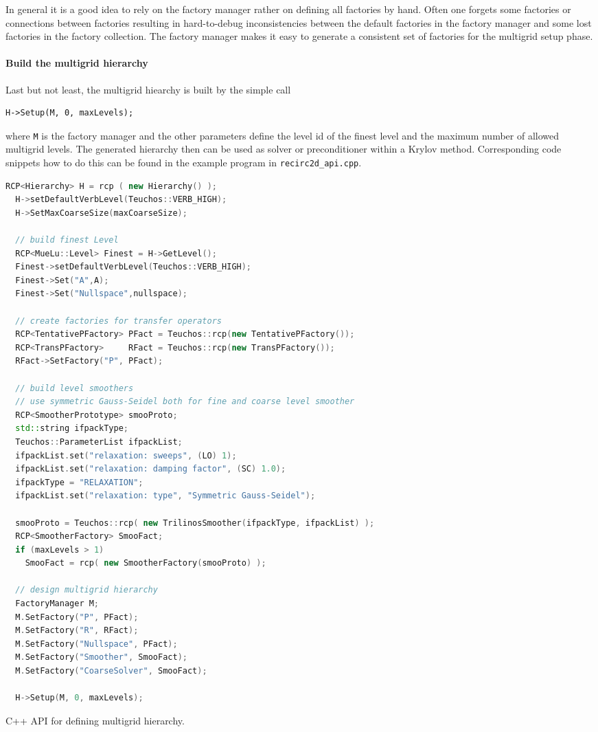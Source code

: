 \documentclass[12pt,a4paper]{article}
\begin{document}
In general it is a good idea to rely on the factory manager rather on defining all factories by hand. Often one forgets some factories or connections between factories resulting in hard-to-debug inconsistencies between the default factories in the factory manager and some lost factories in the factory collection. The factory manager makes it easy to generate a consistent set of factories for the multigrid setup phase.

\paragraph{Build the multigrid hierarchy}
Last but not least, the multigrid hiearchy is built by the simple call
\begin{verbatim}
H->Setup(M, 0, maxLevels);
\end{verbatim}
where \verb|M| is the factory manager and the other parameters define the level id of the finest level and the maximum number of allowed multigrid levels.
The generated hierarchy then can be used as solver or preconditioner within a Krylov method. Corresponding code snippets how to do this can be found in the example program in \verb|recirc2d_api.cpp|.

\begin{Listing}
\begin{center}
\begin{lstlisting}[language=c++]
  RCP<Hierarchy> H = rcp ( new Hierarchy() );
  H->setDefaultVerbLevel(Teuchos::VERB_HIGH);
  H->SetMaxCoarseSize(maxCoarseSize);

  // build finest Level
  RCP<MueLu::Level> Finest = H->GetLevel();
  Finest->setDefaultVerbLevel(Teuchos::VERB_HIGH);
  Finest->Set("A",A);
  Finest->Set("Nullspace",nullspace);

  // create factories for transfer operators
  RCP<TentativePFactory> PFact = Teuchos::rcp(new TentativePFactory());
  RCP<TransPFactory>     RFact = Teuchos::rcp(new TransPFactory());
  RFact->SetFactory("P", PFact);

  // build level smoothers
  // use symmetric Gauss-Seidel both for fine and coarse level smoother
  RCP<SmootherPrototype> smooProto;
  std::string ifpackType;
  Teuchos::ParameterList ifpackList;
  ifpackList.set("relaxation: sweeps", (LO) 1);
  ifpackList.set("relaxation: damping factor", (SC) 1.0);
  ifpackType = "RELAXATION";
  ifpackList.set("relaxation: type", "Symmetric Gauss-Seidel");

  smooProto = Teuchos::rcp( new TrilinosSmoother(ifpackType, ifpackList) );
  RCP<SmootherFactory> SmooFact;
  if (maxLevels > 1)
    SmooFact = rcp( new SmootherFactory(smooProto) );

  // design multigrid hierarchy
  FactoryManager M;
  M.SetFactory("P", PFact);
  M.SetFactory("R", RFact);
  M.SetFactory("Nullspace", PFact);
  M.SetFactory("Smoother", SmooFact);
  M.SetFactory("CoarseSolver", SmooFact);

  H->Setup(M, 0, maxLevels);
\end{lstlisting}
\caption{C++ API for defining multigrid hierarchy.}
\label{listing:CppAPI}
\end{center}
\end{Listing}
\end{document}
